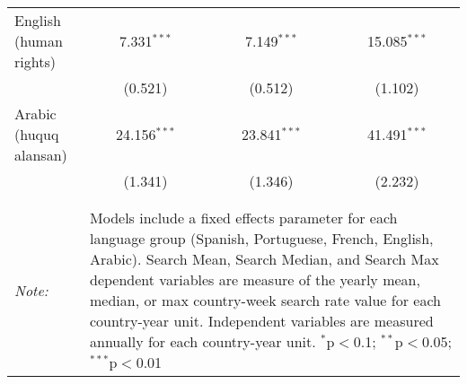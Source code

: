 \begin{table}[!htbp]
\begin{tabular}{@{\extracolsep{5pt}}lccc}
  English (human rights) & 7.331$^{***}$ & 7.149$^{***}$ & 15.085$^{***}$ \\ 
  & (0.521) & (0.512) & (1.102) \\ 
  Arabic (huquq alansan) & 24.156$^{***}$ & 23.841$^{***}$ & 41.491$^{***}$ \\ 
  & (1.341) & (1.346) & (2.232) \\ 
 \hline \\[-1.8ex] 
\hline 
\hline \\[-1.8ex] 
\textit{Note:}  & \multicolumn{3}{l}{\parbox[t]{8cm}{Models include a fixed effects parameter for each language group (Spanish, Portuguese, French, English, Arabic). Search Mean, Search Median, and Search Max dependent variables are measure of the yearly mean, median, or max country-week search rate value for each country-year unit. Independent variables are measured annually for each country-year unit. $^{*}$p$<$0.1; $^{**}$p$<$0.05; $^{***}$p$<$0.01}} \\ 
\end{tabular} 
\end{table} 

